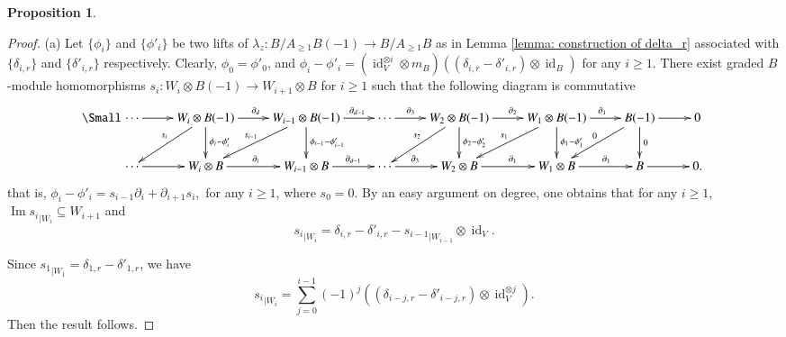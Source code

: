 \documentclass[a4paper,10pt]{amsart}
\newtheorem{proposition}[theorem]{Proposition}
\theoremstyle{definition}
\numberwithin{equation}{section}
\DeclareMathOperator{\Image}{Im} \DeclareMathOperator{\Ext}{Ext}
\DeclareMathOperator{\id}{id}
\begin{document}
\begin{proposition}
\end{proposition}
\begin{proof}
(a)
Let $\{\phi_{i}\}$ and $\{\phi'_{i}\}$ be two lifts of $\lambda_z:B/A_{\geq 1}B(-1)\to B/A_{\geq1}B$ as in Lemma \ref{lemma: construction of delta_r} associated with $\{\delta_{i,r}\}$ and $\{\delta'_{i,r}\}$ respectively. Clearly, $\phi_0=\phi'_0$, %
and $\phi_i-\phi'_i= (\id_V^{\otimes i}\otimes m_B)\left((\delta_{i,r}-\delta'_{i,r})\otimes\id_B\right)$ for any $i\geq 1$. There exist graded $B$-module homomorphisms $s_i:W_i\otimes B(-1)\to W_{i+1}\otimes B$ for $i\geq 1$ such that the following diagram is commutative
$${\Small
\xymatrix{
\cdots\ar[r] & W_i\otimes B(-1) \ar[r]^{\partial_d}\ar[ld]_{s_i}\ar[d]^{\phi_i-\phi'_i} &W_{i-1}\otimes B(-1)\ar[r]^(0.65){\partial_{d-1}}\ar[ld]_{s_{i-1}}\ar[d]^{\phi_{i-1}-\phi'_{i-1}}&\cdots\ar[r]^(0.35){\partial_{3}}&W_2\otimes B(-1)\ar[ld]_{s_2}\ar[r]^(0.55){\partial_2}\ar[d]^{\phi_2-\phi'_2} &W_1\otimes B(-1)\ar[ld]_{s_1}\ar[r]^(0.55){\partial_{1}}\ar[d]^{\phi_1-\phi'_1} &B(-1)\ar[r]\ar[d]^{0}\ar[ld]_{0}&0
\\
\cdots\ar[r] & W_i\otimes B \ar[r]^{\partial_i} &W_{i-1}\otimes B\ar[r]^(0.6){{\partial_{d-1}}}&\cdots\ar[r]^(0.41){{\partial_{3}}}&W_2\otimes B\ar[r]^(0.55){\partial_{1}} &W_1\otimes B\ar[r]^(0.6){{\partial_{1}}} &B\ar[r]&0.
}
}
$$
that is, $\phi_i-\phi'_i=s_{i-1}\partial_i+\partial_{i+1}s_{i},$ for any $i\geq 1$, where $s_0=0$. By an easy argument on degree, one obtains that for any $i\geq 1$, $\Image {s_i}_{\mid W_i}\subseteq W_{i+1}$ and
$${s_i}_{\mid W_i}=\delta_{i,r}-\delta'_{i,r}-{s_{i-1}}_{\mid W_{i-1}}\otimes\id_V.$$

Since ${s_{1}}_{\mid W_1}=\delta_{1,r}-\delta'_{1,r}$, we have
$$
{s_i}_{\mid W_i}=\sum_{j=0}^{i-1}(-1)^j\left((\delta_{i-j,r}-\delta'_{i-j,r})\otimes\id_V^{\otimes j}\right).
$$
Then the result follows.



\end{proof}
\end{document}
